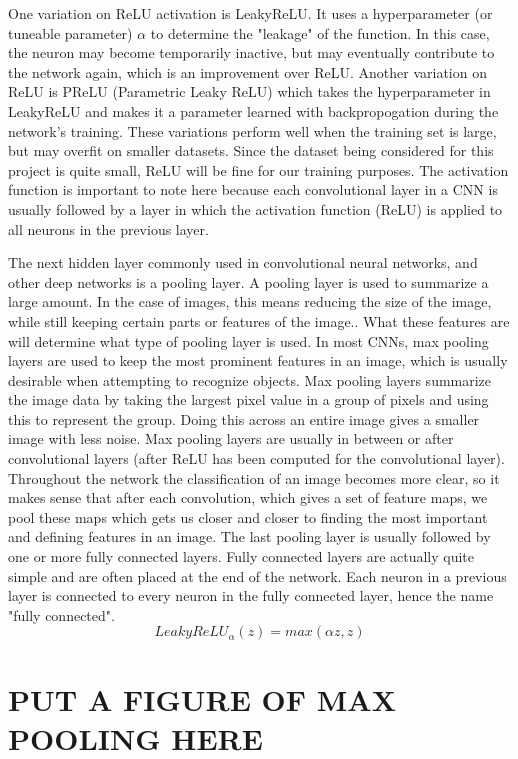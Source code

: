 \documentclass[12pt]{report} %
\begin{document}
	One variation on ReLU activation is LeakyReLU. It uses a hyperparameter (or tuneable parameter) \( \alpha \) to determine the "leakage" of the function. In this case, the neuron may become temporarily inactive, but may eventually contribute to the network again, which is an improvement over ReLU. Another variation on ReLU is PReLU (Parametric Leaky ReLU) which takes the hyperparameter in LeakyReLU and makes it a parameter learned with backpropogation during the network's training. These variations perform well when the training set is large, but may overfit on smaller datasets. Since the dataset being considered for this project is quite small, ReLU will be fine for our training purposes. The activation function is important to note here because each convolutional layer in a CNN is usually followed by a layer in which the activation function (ReLU) is applied to all neurons in the previous layer.\cite{aurelienMachineLearning} 
 
	The next hidden layer commonly used in convolutional neural networks, and other deep networks is a pooling layer. A pooling layer is used to summarize a large amount. In the case of images, this means reducing the size of the image, while still keeping certain parts or features of the image.\cite{aurelienMachineLearning}. What these features are will determine what type of pooling layer is used. In most CNNs, max pooling layers are used to keep the most prominent features in an image, which is usually desirable when attempting to recognize objects. 
	Max pooling layers summarize the image data by taking the largest pixel value in a group of pixels and using this to represent the group. Doing this across an entire image gives a smaller image with less noise. Max pooling layers are usually in between or after convolutional layers (after ReLU has been computed for the convolutional layer). Throughout the network the classification of an image becomes more clear, so it makes sense that after each convolution, which gives a set of feature maps, we pool these maps which gets us closer and closer to finding the most important and defining features in an image. 
	The last pooling layer is usually followed by one or more fully connected layers. Fully connected layers are actually quite simple and are often placed at the end of the network. Each neuron in a previous layer is connected to every neuron in the fully connected layer, hence the name "fully connected"\cite{LeonardoFully}. 
 \begin{equation}
LeakyReLU_\alpha(z) = max(\alpha z, z)
  \end{equation}
  
  \section{PUT A  FIGURE OF MAX POOLING HERE }

\newpage


\end{document}
